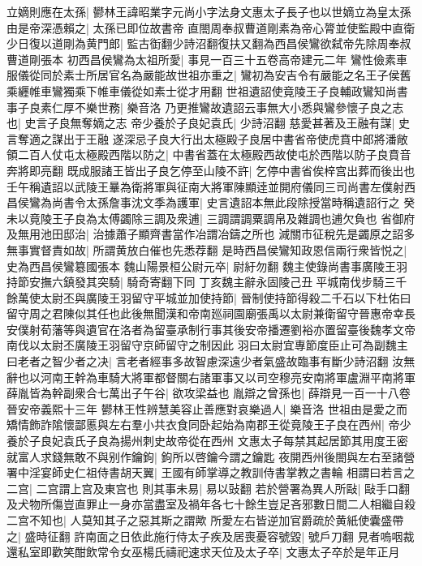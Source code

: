 立嫡則應在太孫|{
	鬰林王諱昭業字元尚小字法身文惠太子長子也以世嫡立為皇太孫}
由是帝深憑賴之|{
	太孫已即位故書帝}
直閤周奉叔曹道剛素為帝心膂並使監殿中直衛少日復以道剛為黄門郎|{
	監古衘翻少詩沼翻復扶又翻為西昌侯鸞欲弑帝先除周奉叔曹道剛張本}
初西昌侯鸞為太祖所愛|{
	事見一百三十五卷高帝建元二年}
鸞性儉素車服儀從同於素士所居官名為嚴能故世祖亦重之|{
	鸞初為安吉令有嚴能之名王子侯舊乘纒帷車鸞獨乘下帷車儀從如素士從才用翻}
世祖遺詔使竟陵王子良輔政鸞知尚書事子良素仁厚不樂世務|{
	樂音洛}
乃更推鸞故遺詔云事無大小悉與鸞參懷子良之志也|{
	史言子良無奪嫡之志}
帝少養於子良妃袁氏|{
	少詩沼翻}
慈愛甚著及王融有謀|{
	史言奪適之謀出于王融}
遂深忌子良大行出太極殿子良居中書省帝使虎賁中郎將潘敞領二百人仗屯太極殿西階以防之|{
	中書省蓋在太極殿西故使屯於西階以防子良賁音奔將即亮翻}
既成服諸王皆出子良乞停至山陵不許|{
	乞停中書省俟梓宫出葬而後出也}
壬午稱遺詔以武陵王曅為衛將軍與征南大將軍陳顯逹並開府儀同三司尚書左僕射西昌侯鸞為尚書令太孫詹事沈文季為護軍|{
	史言遺詔本無此段除授當時稱遺詔行之}
癸未以竟陵王子良為太傅蠲除三調及衆逋|{
	三調謂調粟調帛及雜調也逋欠負也}
省御府及無用池田邸治|{
	治據蕭子顯齊書當作冶謂冶鑄之所也}
減關市征稅先是蠲原之詔多無事實督責如故|{
	所謂黄放白催也先悉荐翻}
是時西昌侯鸞知政恩信兩行衆皆悦之|{
	史為西昌侯鸞簒國張本}
魏山陽景桓公尉元卒|{
	尉紆勿翻}
魏主使錄尚書事廣陵王羽持節安撫六鎮發其突騎|{
	騎奇寄翻下同}
丁亥魏主辭永固陵己丑平城南伐步騎三千餘萬使太尉丕與廣陵王羽留守平城並加使持節|{
	晉制使持節得殺二千石以下杜佑曰留守周之君陳似其任也此後無聞漢和帝南廵祠園廟張禹以太尉兼衛留守晉惠帝幸長安僕射荀藩等與遺官在洛者為留臺承制行事其後安帝播遷劉裕亦置留臺後魏孝文帝南伐以太尉丕廣陵王羽留守京師留守之制因此}
羽曰太尉宜專節度臣止可為副魏主曰老者之智少者之决|{
	言老者經事多故智慮深遠少者氣盛故臨事有斷少詩沼翻}
汝無辭也以河南王幹為車騎大將軍都督關右諸軍事又以司空穆亮安南將軍盧淵平南將軍薛胤皆為幹副衆合七萬出子午谷|{
	欲攻梁益也}
胤辯之曾孫也|{
	薛辯見一百一十八卷晉安帝義熙十三年}
鬰林王性辨慧美容止善應對哀樂過人|{
	樂音洛}
世祖由是愛之而矯情飾詐隂懷鄙慝與左右羣小共衣食同卧起始為南郡王從竟陵王子良在西州|{
	帝少養於子良妃袁氏子良為揚州刺史故帝從在西州}
文惠太子每禁其起居節其用度王密就富人求錢無敢不與别作鑰鉤|{
	鉤所以啓鑰今謂之鑰匙}
夜開西州後閤與左右至諸營署中淫宴師史仁祖侍書胡天翼|{
	王國有師掌導之教訓侍書掌教之書輪}
相謂曰若言之二宫|{
	二宫謂上宫及東宫也}
則其事未易|{
	易以䜴翻}
若於營署為異人所敺|{
	敺手口翻}
及犬物所傷豈直罪止一身亦當盡室及禍年各七十餘生豈足吝邪數日間二人相繼自殺二宫不知也|{
	人莫知其子之惡其斯之謂歟}
所愛左右皆逆加官爵疏於黄紙使囊盛帶之|{
	盛時征翻}
許南面之日依此施行侍太子疾及居喪憂容號毀|{
	號戶刀翻}
見者嗚咽裁還私室即歡笑酣飲常令女巫楊氏禱祀速求天位及太子卒|{
	文惠太子卒於是年正月}
